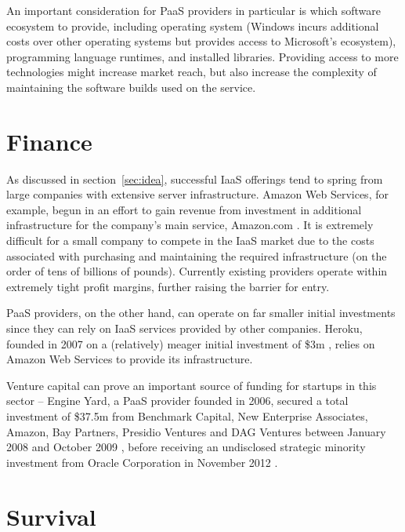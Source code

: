 \documentclass[a4paper]{proc}
\begin{document}
  An important consideration for PaaS providers in particular is which software ecosystem to provide, including operating system (Windows incurs additional costs over other operating systems but provides access to Microsoft's ecosystem), programming language runtimes, and installed libraries. Providing access to more technologies might increase market reach, but also increase the complexity of maintaining the software builds used on the service.

  \section{Finance}
  \label{sec:finance}


  As discussed in section~\ref{sec:idea}, successful IaaS offerings tend to spring from large companies with extensive server infrastructure. Amazon Web Services, for example, begun in an effort to gain revenue from investment in additional infrastructure for the company's main service, Amazon.com \cite{Black2009}. It is extremely difficult for a small company to compete in the IaaS market due to the costs associated with purchasing and maintaining the required infrastructure (on the order of tens of billions of pounds). Currently existing providers operate within extremely tight profit margins, further raising the barrier for entry.

  PaaS providers, on the other hand, can operate on far smaller initial investments since they can rely on IaaS services provided by other companies. Heroku, founded in 2007 on a (relatively) meager initial investment of \$3m \cite{Hendrickson2008}, relies on Amazon Web Services to provide its infrastructure.

  Venture capital can prove an important source of funding for startups in this sector -- Engine Yard, a PaaS provider founded in 2006, secured a total investment of \$37.5m from Benchmark Capital, New Enterprise Associates, Amazon, Bay Partners, Presidio Ventures and DAG Ventures between January 2008 and October 2009 \cite{Schonfeld2008} \cite{Lerner2008}, before receiving an undisclosed strategic minority investment from Oracle Corporation in November 2012 \cite{Oracle2012}.

  \section{Survival}
  \label{sec:survival}
\end{document}

